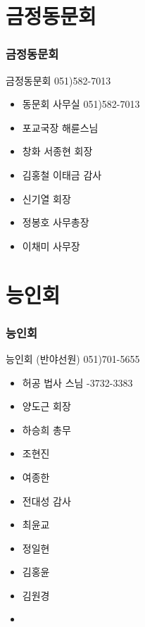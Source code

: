 \documentclass[aspectratio=1610,20pt,xcolor=pdftex,dvipsnames,table,handout]{beamer}
\begin{document}
		\section{금정동문회}
		\begin{frame} [t,plain]
		\frametitle{금정동문회}
			\begin{block} {금정동문회 051)582-7013}
			\setlength{\leftmargini}{1em}			
			\begin{itemize}
				\item 동문회 사무실 051)582-7013
				\item 포교국장 해륜스님 	\hrulefill
				\item 창화 서종현 회장	\hrulefill
				\item 김홍철 이태금 감사	\hrulefill
				\item 신기열 회장	\hrulefill
				\item 정봉호 사무총장 	\hrulefill
				\item 이채미 사무장 	\hrulefill

			\end{itemize}
			\end{block}						
		\end{frame}					


		\section{능인회}
		\begin{frame} [t,plain]
		\frametitle{능인회}
			\begin{block} {능인회 (반야선원) 051)701-5655 }
			\setlength{\leftmargini}{1em}			
			\begin{itemize}
				\item 허공 법사 스님 	-3732-3383
				\item 양도근 회장	\hrulefill
				\item 하승희 총무	\hrulefill
				\item 조현진 	\hrulefill
				\item 여종한	\hrulefill
				\item 전대성 감사	\hrulefill
				\item 최윤교 	\hrulefill
				\item 정일현	\hrulefill
				\item 김홍윤	\hrulefill
				\item 김원경	\hrulefill
				\item 

			\end{itemize}
			\end{block}						
		\end{frame}					
\end{document}
